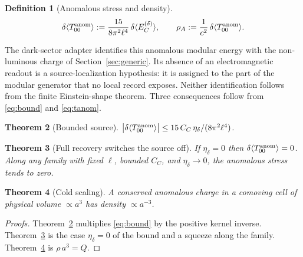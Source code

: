 \documentclass[11pt]{article}
\newtheorem{theorem}{Theorem}[section]
\newtheorem{definition}[theorem]{Definition}
\begin{document}
\begin{definition}[Anomalous stress and density]
\begin{equation}
\delta\langle T_{00}^{\rm anom}\rangle
:=\frac{15}{8\pi^2\ell^4}\,\delta\langle E_C^{(\delta)}\rangle,
\qquad
\rho_A:=\frac{1}{c^2}\,\delta\langle T_{00}^{\rm anom}\rangle .
\label{eq:tanom}
\end{equation}
\end{definition}

The dark-sector adapter identifies this anomalous modular energy with the
non-luminous charge of Section~\ref{sec:generic}. Its absence of an
electromagnetic readout is a source-localization hypothesis: it is assigned to
the part of the modular generator that no local record exposes. Neither
identification follows from the finite Einstein-shape theorem. Three consequences follow from
\eqref{eq:bound} and \eqref{eq:tanom}.

\begin{theorem}[Bounded source]
\label{thm:bounded}
\(\bigl|\delta\langle T_{00}^{\rm anom}\rangle\bigr|
\le 15\,C_C\,\eta_\delta/(8\pi^2\ell^4)\).
\end{theorem}

\begin{theorem}[Full recovery switches the source off]
\label{thm:off}
If \(\eta_\delta=0\) then \(\delta\langle T_{00}^{\rm anom}\rangle=0\).
Along any family with fixed \(\ell\), bounded \(C_C\), and
\(\eta_\delta\to0\), the anomalous stress tends to zero.
\end{theorem}

\begin{theorem}[Cold scaling]
\label{thm:cold}
A conserved anomalous charge in a comoving cell of physical volume
\(\propto a^3\) has density \(\propto a^{-3}\).
\end{theorem}

\begin{proof}[Proofs]
Theorem~\ref{thm:bounded} multiplies \eqref{eq:bound} by the positive kernel
inverse. Theorem~\ref{thm:off} is the case \(\eta_\delta=0\) of the bound and
a squeeze along the family. Theorem~\ref{thm:cold} is
\(\rho\,a^3=Q\).
\end{proof}
\end{document}
